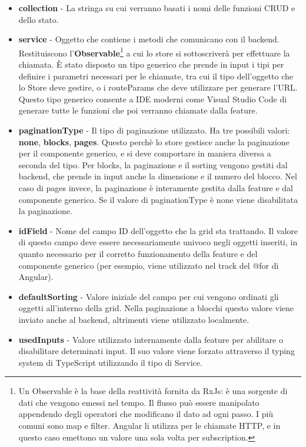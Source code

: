 \begin{itemize}
  \item \textbf{collection} - La stringa su cui verranno basati i nomi delle funzioni CRUD e dello stato.
  \item \textbf{service} - Oggetto che contiene i metodi che comunicano con il backend. Restituiscono
    l'\textbf{Observable}\footnote{Un Observable \`e la base della reattivit\`a fornita da RxJs: \`e una sorgente di dati che vengono emessi nel tempo.
      Il flusso pu\`o essere manipolato appendendo degli operatori che modificano il dato ad ogni passo. I pi\`u comuni sono map e filter.
    Angular li utilizza per le chiamate HTTP, e in questo caso emettono un valore una sola volta per subscription.}
    a cui lo store si sottoscriver\`a
    per effettuare la chiamata. \`E stato disposto un tipo generico che prende in input i tipi per definire i parametri necessari per le chiamate, tra cui il tipo
    dell'oggetto che lo Store deve gestire, o i routeParams che deve utilizzare per generare l'URL. Questo tipo generico consente a IDE moderni come Visual Studio Code di
    generare tutte le funzioni che poi verranno chiamate dalla feature.
  \item \textbf{paginationType} - Il tipo di paginazione utilizzato. Ha tre possibili valori: \textbf{none}, \textbf{blocks}, \textbf{pages}. Questo perch\`e lo store
    gestisce anche la paginazione per il componente generico, e si deve comportare in maniera diversa a seconda del tipo. Per blocks, la paginazione e il sorting
    vengono gestiti dal backend, che prende in input anche la dimensione e il numero del blocco. Nel caso di pages invece, la paginazione \`e interamente gestita
    dalla feature e dal componente generico. Se il valore di paginationType \`e none viene disabilitata la paginazione.
  \item \textbf{idField} - Nome del campo ID dell'oggetto che la grid sta trattando. Il valore di questo campo deve essere necessariamente univoco negli oggetti inseriti,
    in quanto necessario per il corretto funzionamento della feature e del componente generico (per esempio, viene utilizzato nel track del @for di Angular).
  \item \textbf{defaultSorting} - Valore iniziale del campo per cui vengono ordinati gli oggetti all'interno della grid. Nella paginazione a blocchi questo valore viene inviato
    anche al backend, altrimenti viene utilizzato localmente.
  \item \textbf{usedInputs} - Valore utilizzato internamente dalla feature per abilitare o disabilitare determinati input. Il suo valore viene forzato attraverso il typing system
    di TypeScript utilizzando il tipo di Service.
\end{itemize}
